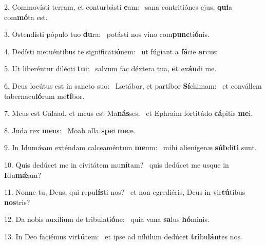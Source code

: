 2. Commovísti terram, et conturbásti \textbf{e}am: \ast\  sana contritiónes ejus, \textbf{qui}a com\textbf{mó}ta est.\

3. Ostendísti pópulo tuo \textbf{du}ra: \ast\  potásti nos vino com\textbf{punc}ti\textbf{ó}nis.\

4. Dedísti metuéntibus te significati\textbf{ó}nem: \ast\  ut fúgiant a \textbf{fá}cie \textbf{ar}cus:\

5. Ut liberéntur dilécti \textbf{tu}i: \ast\  salvum fac déxtera tua, \textbf{et} ex\textbf{áu}di me.\

6. Deus locútus est in sancto suo: \dag\  Lætábor, et partíbor \textbf{Sí}chimam: \ast\  et convállem tabernacu\textbf{ló}rum me\textbf{tí}bor.\

7. Meus est Gálaad, et meus est Ma\textbf{nás}ses: \ast\  et Ephraim fortitúdo \textbf{cá}pitis \textbf{me}i.\

8. Juda rex \textbf{me}us: \ast\  Moab olla \textbf{spe}i \textbf{me}æ.\

9. In Idumǽam exténdam calceaméntum \textbf{me}um: \ast\  mihi alienígenæ \textbf{súb}di\textbf{ti} sunt.\

10. Quis dedúcet me in civitátem mu\textbf{ní}tam? \ast\  quis dedúcet me usque in \textbf{I}du\textbf{mǽ}am?\

11. Nonne tu, Deus, qui repu\textbf{lís}ti nos? \ast\  et non egrediéris, Deus in vir\textbf{tú}tibus \textbf{nos}tris?\

12. Da nobis auxílium de tribulati\textbf{ó}ne: \ast\  quia vana \textbf{sa}lus \textbf{hó}minis.\

13. In Deo faciémus vir\textbf{tú}tem: \ast\  et ipse ad níhilum dedúcet \textbf{tri}bu\textbf{lán}tes nos.\

